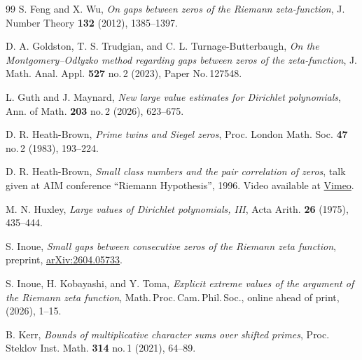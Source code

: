 \documentclass[12pt, oneside]{amsart}
\theoremstyle{definition}
\newcommand{\1}{\mathds{1}}
\begin{document}
\begin{thebibliography}{99}
 S. Feng and X. Wu, \emph{On gaps between zeros of the Riemann zeta-function}, J. Number Theory {\bf 132} (2012), 1385--1397.


 D. A. Goldston, T. S. Trudgian, and C. L. Turnage-Butterbaugh, \emph{On the Montgomery--Odlyzko method regarding gaps between zeros of the zeta-function}, J. Math. Anal. Appl. {\bf 527} no.\,2 (2023), Paper No.\,127548.

 L. Guth and J. Maynard, \emph{New large value estimates for Dirichlet polynomials}, Ann. of Math. {\bf 203} no.\,2 (2026), 623--675.

 D. R. Heath-Brown, \emph{Prime twins and Siegel zeros}, Proc. London Math. Soc. {\bf 47} no.\,2 (1983), 193--224.

 D. R. Heath-Brown, \emph{Small class numbers and the pair correlation of zeros}, talk given at AIM conference ``Riemann Hypothesis'', 1996. Video available at \href{https://vimeo.com/showcase/4967015?video=287694279}{Vimeo}.

 M. N. Huxley, \emph{Large values of Dirichlet polynomials, III}, Acta Arith. {\bf 26} (1975), 435--444.

 S. Inoue, \emph{Small gaps between consecutive zeros of the Riemann zeta function}, preprint, \href{https://arxiv.org/abs/2604.05733}{arXiv:2604.05733}.

 S. Inoue, H. Kobayashi, and Y. Toma, \emph{Explicit extreme values of the argument of the Riemann zeta function}, Math.\,Proc.\,Cam.\,Phil.\,Soc., online ahead of print, (2026), 1--15.



 B. Kerr, \emph{Bounds of multiplicative character sums over shifted primes}, Proc. Steklov Inst. Math. {\bf 314} no.\,1 (2021), 64--89.



\end{thebibliography}
\end{document}
